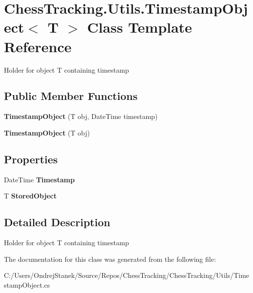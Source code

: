 \hypertarget{class_chess_tracking_1_1_utils_1_1_timestamp_object}{}\section{Chess\+Tracking.\+Utils.\+Timestamp\+Object$<$ T $>$ Class Template Reference}
\label{class_chess_tracking_1_1_utils_1_1_timestamp_object}


Holder for object T containing timestamp  


\subsection*{Public Member Functions}
\begin{DoxyCompactItemize}
\item 
\mbox{\label{class_chess_tracking_1_1_utils_1_1_timestamp_object_a8cc2ab235d2bbacd78f19e2f6326f164}} 
{\bfseries Timestamp\+Object} (T obj, Date\+Time timestamp)
\item 
\mbox{\label{class_chess_tracking_1_1_utils_1_1_timestamp_object_a0e275a63d75c27b8ffcb5bbe9d7815dc}} 
{\bfseries Timestamp\+Object} (T obj)
\end{DoxyCompactItemize}
\subsection*{Properties}
\begin{DoxyCompactItemize}
\item 
\mbox{\label{class_chess_tracking_1_1_utils_1_1_timestamp_object_a64f26436341f2420489efdaae251b2cf}} 
Date\+Time {\bfseries Timestamp}
\item 
\mbox{\label{class_chess_tracking_1_1_utils_1_1_timestamp_object_a510072b7dbe8e374bbaf817e31d42c3b}} 
T {\bfseries Stored\+Object}
\end{DoxyCompactItemize}


\subsection{Detailed Description}
Holder for object T containing timestamp 



The documentation for this class was generated from the following file\+:\begin{DoxyCompactItemize}
\item 
C\+:/\+Users/\+Ondrej\+Stanek/\+Source/\+Repos/\+Chess\+Tracking/\+Chess\+Tracking/\+Utils/Timestamp\+Object.\+cs\end{DoxyCompactItemize}
